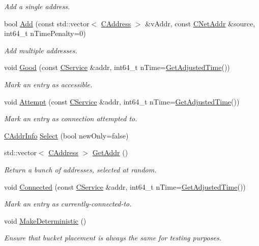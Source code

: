 \begin{DoxyCompactItemize}
\begin{DoxyCompactList}\small\item\em Add a single address. \end{DoxyCompactList}\item 
bool \mbox{\hyperlink{class_c_addr_man_aa2ae2abdf710b2d81fa37f072bab028e}{Add}} (const std\+::vector$<$ \mbox{\hyperlink{class_c_address}{C\+Address}} $>$ \&v\+Addr, const \mbox{\hyperlink{class_c_net_addr}{C\+Net\+Addr}} \&source, int64\+\_\+t n\+Time\+Penalty=0)
\begin{DoxyCompactList}\small\item\em Add multiple addresses. \end{DoxyCompactList}\item 
void \mbox{\hyperlink{class_c_addr_man_a993e80e74701d7bc6bb49880c387b847}{Good}} (const \mbox{\hyperlink{class_c_service}{C\+Service}} \&addr, int64\+\_\+t n\+Time=\mbox{\hyperlink{timedata_8h_a09f81b9c7650f898cf3cf305b87547e6}{Get\+Adjusted\+Time}}())
\begin{DoxyCompactList}\small\item\em Mark an entry as accessible. \end{DoxyCompactList}\item 
void \mbox{\hyperlink{class_c_addr_man_afcddc2573121065177dc981cea710789}{Attempt}} (const \mbox{\hyperlink{class_c_service}{C\+Service}} \&addr, int64\+\_\+t n\+Time=\mbox{\hyperlink{timedata_8h_a09f81b9c7650f898cf3cf305b87547e6}{Get\+Adjusted\+Time}}())
\begin{DoxyCompactList}\small\item\em Mark an entry as connection attempted to. \end{DoxyCompactList}\item 
\mbox{\hyperlink{class_c_addr_info}{C\+Addr\+Info}} \mbox{\hyperlink{class_c_addr_man_a6279e9fdd1b78378c016087daf09a439}{Select}} (bool new\+Only=false)
\item 
std\+::vector$<$ \mbox{\hyperlink{class_c_address}{C\+Address}} $>$ \mbox{\hyperlink{class_c_addr_man_a69cc6138e696cf88de60925d26023bf2}{Get\+Addr}} ()
\begin{DoxyCompactList}\small\item\em Return a bunch of addresses, selected at random. \end{DoxyCompactList}\item 
void \mbox{\hyperlink{class_c_addr_man_a7aba66d9e9527522fed974567d34c322}{Connected}} (const \mbox{\hyperlink{class_c_service}{C\+Service}} \&addr, int64\+\_\+t n\+Time=\mbox{\hyperlink{timedata_8h_a09f81b9c7650f898cf3cf305b87547e6}{Get\+Adjusted\+Time}}())
\begin{DoxyCompactList}\small\item\em Mark an entry as currently-\/connected-\/to. \end{DoxyCompactList}\item 
void \mbox{\hyperlink{class_c_addr_man_a242690c5f4d2c14738da47edc5e8275c}{Make\+Deterministic}} ()
\begin{DoxyCompactList}\small\item\em Ensure that bucket placement is always the same for testing purposes. \end{DoxyCompactList}\end{DoxyCompactItemize}

